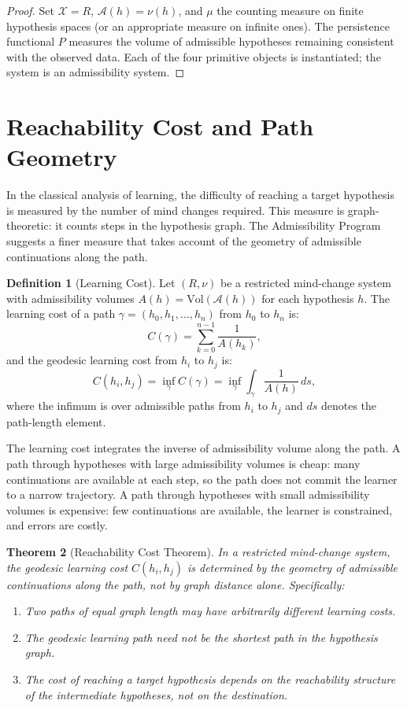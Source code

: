 \documentclass[12pt, oneside]{book}
\theoremstyle{flyxion}
\newtheorem{theorem}{Theorem}[chapter]
\theoremstyle{definition}
\newtheorem{definition}[theorem]{Definition}
\begin{document}
\begin{proof}
Set $\mathcal{X} = R$, $\mathcal{A}(h) = \nu(h)$, and
$\mu$ the counting measure on finite hypothesis spaces
(or an appropriate measure on infinite ones). The
persistence functional $P$ measures the volume of
admissible hypotheses remaining consistent with the
observed data. Each of the four primitive objects is
instantiated; the system is an admissibility system.
\end{proof}

\section{Reachability Cost and Path Geometry}

In the classical analysis of learning, the difficulty
of reaching a target hypothesis is measured by the
number of mind changes required. This measure is
graph-theoretic: it counts steps in the hypothesis
graph. The Admissibility Program suggests a finer
measure that takes account of the geometry of
admissible continuations along the path.

\begin{definition}[Learning Cost]
Let $(R, \nu)$ be a restricted mind-change system
with admissibility volumes $A(h) = \mathrm{Vol}
(\mathcal{A}(h))$ for each hypothesis $h$. The
learning cost of a path $\gamma = (h_0, h_1, \ldots,
h_n)$ from $h_0$ to $h_n$ is:
\[
C(\gamma) = \sum_{k=0}^{n-1} \frac{1}{A(h_k)},
\]
and the geodesic learning cost from $h_i$ to $h_j$
is:
\[
C(h_i, h_j) = \inf_\gamma C(\gamma)
= \inf_\gamma \int_\gamma \frac{1}{A(h)}\,ds,
\]
where the infimum is over admissible paths from $h_i$
to $h_j$ and $ds$ denotes the path-length element.
\end{definition}

The learning cost integrates the inverse of admissibility
volume along the path. A path through hypotheses with
large admissibility volumes is cheap: many continuations
are available at each step, so the path does not commit
the learner to a narrow trajectory. A path through
hypotheses with small admissibility volumes is expensive:
few continuations are available, the learner is
constrained, and errors are costly.

\begin{theorem}[Reachability Cost Theorem]
\label{thm:reachability_cost}
In a restricted mind-change system, the geodesic
learning cost $C(h_i, h_j)$ is determined by the
geometry of admissible continuations along the path,
not by graph distance alone. Specifically:
\begin{enumerate}
\item[(i)] Two paths of equal graph length may have
   arbitrarily different learning costs.
\item[(ii)] The geodesic learning path need not be
   the shortest path in the hypothesis graph.
\item[(iii)] The cost of reaching a target hypothesis
   depends on the reachability structure of the
   intermediate hypotheses, not on the destination.
\end{enumerate}
\end{theorem}
\end{document}
